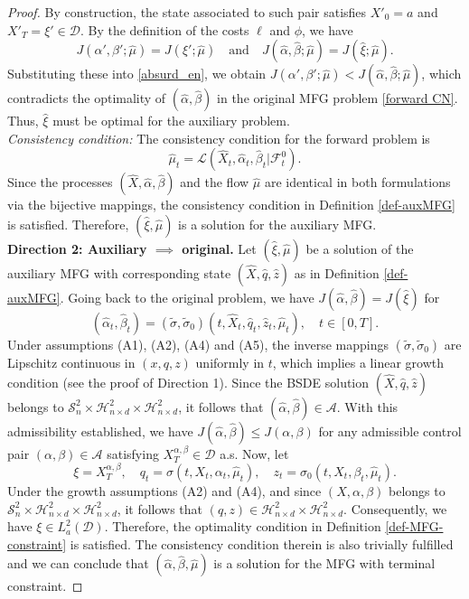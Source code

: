 \documentclass[11pt,a4paper]{article}
\begin{document}
\begin{proof}
By construction, the state associated to such pair satisfies $X'_0 = a$ and $X'_T = \xi' \in \mathcal{D}$. By the definition of the costs $\ell$ and $\phi$, we have
\[ J(\alpha', \beta'; \hat \mu) = J(\xi'; \hat \mu) \quad \text{and} \quad J(\hat \alpha, \hat \beta; \hat \mu) = J(\hat \xi; \hat \mu). \]
Substituting these into \eqref{absurd_en}, we obtain $J(\alpha', \beta'; \hat \mu) < J(\hat \alpha, \hat \beta; \hat \mu)$, which contradicts the optimality of $(\hat \alpha, \hat \beta)$ in the original MFG problem \eqref{forward CN}. Thus, $\hat \xi$ must be optimal for the auxiliary problem.\\
\textit{Consistency condition:} 
    The consistency condition for the forward problem is $$\hat \mu_t = \mathcal{L}(\hat X_t, \hat \alpha_t, \hat \beta_t | \mathcal{F}_t^0).$$ 
    Since the processes $(\hat X, \hat \alpha, \hat \beta)$ and the flow $\hat \mu$ are identical in both formulations via the bijective mappings, the consistency condition in Definition \ref{def-auxMFG} is satisfied.
Therefore, $(\hat \xi, \hat \mu)$ is a solution for the auxiliary MFG.\\
\textbf{Direction 2: Auxiliary $\implies$ original.} 
Let $(\hat \xi, \hat \mu)$ be a solution of the auxiliary MFG with corresponding state $(\hat X, \hat q, \hat z)$ as in Definition \ref{def-auxMFG}. Going back to the original problem, we have $J(\hat \alpha, \hat \beta)=J(\hat \xi)$ for
\[ (\hat \alpha_t , \hat \beta_t ) = (\tilde \sigma, \tilde \sigma_0)(t, \hat X_t , \hat q_t , \hat z_t, \hat \mu_t), \quad t\in [0,T]. \]
Under assumptions (A1), (A2), (A4) and (A5), the inverse mappings $(\tilde \sigma, \tilde \sigma_0)$ are Lipschitz continuous in $(x, q, z)$ uniformly in $t$, which implies a linear growth condition (see the proof of Direction 1). Since the BSDE solution $(\hat X, \hat q, \hat z)$ belongs to $\mathcal S^2_n \times  \mathcal H^2_{n \times d}\times \mathcal H^2_{n\times d}$, it follows that $(\hat \alpha, \hat \beta) \in \mathcal{A}$.   With this admissibility established, we have $J(\hat \alpha, \hat \beta) \leq J(\alpha,\beta)$ for any admissible control pair $(\alpha, \beta) \in \mathcal{A}$ satisfying $X_T^{\alpha, \beta} \in \mathcal{D}$ a.s. Now, let
\[ \xi = X_T^{\alpha, \beta}, \quad q_t = \sigma(t, X_t, \alpha_t, \hat \mu_t), \quad z_t = \sigma_0(t, X_t, \beta_t, \hat \mu_t). \]
Under the  growth assumptions (A2) and (A4), and since $(X, \alpha, \beta)$ belongs to $\mathcal S^2_n \times  \mathcal H^2_{n \times d}\times \mathcal H^2_{n\times d}$, it follows that $(q, z) \in \mathcal H^2_{n \times d}\times \mathcal H^2_{n\times d}$. 
Consequently, we have $\xi \in L^2_a (\mathcal D)$. Therefore, the optimality condition in Definition \ref{def-MFG-constraint} is satisfied. The consistency condition therein is also trivially fulfilled and we can conclude that $(\hat \alpha, \hat \beta, \hat \mu)$ is a solution for the MFG with terminal constraint.
\end{proof}
\end{document}
